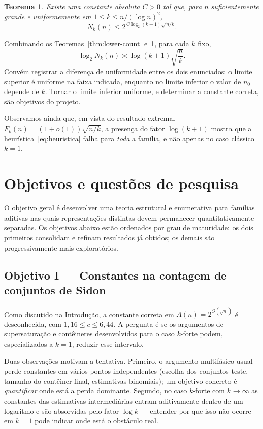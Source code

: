 \documentclass[11pt,a4paper]{article}
\newtheorem{theorem}{Teorema}[section]
\theoremstyle{definition}
\theoremstyle{remark}
\begin{document}
\begin{theorem}
  \label{thm:upper-count}
  Existe uma constante absoluta \(C>0\) tal que, para \(n\)
  suficientemente grande e \emph{uniformemente} em
  \(1\leq k\leq n/(\log n)^2\),
  \[
    N_k(n)\leq2^{\,C\log_2(k+1)\sqrt{n/k}} .
  \]
\end{theorem}

Combinando os Teoremas~\ref{thm:lower-count} e~\ref{thm:upper-count},
para cada \(k\) fixo,
\[
  \log_2 N_k(n)\asymp\log(k+1)\sqrt{\frac nk} .
\]
Convém registrar a diferença de uniformidade entre os dois enunciados: o
limite superior é uniforme na faixa indicada, enquanto no limite
inferior o valor de \(n_0\) depende de \(k\). Tornar o limite inferior
uniforme, e determinar a constante correta, são objetivos do projeto.

Observamos ainda que, em vista do resultado extremal
\(F_k(n)=(1+o(1))\sqrt{n/k}\), a presença do fator \(\log(k+1)\) mostra
que a heurística~\eqref{eq:heuristica} falha para \emph{toda} a família,
e não apenas no caso clássico \(k=1\).

\section{Objetivos e questões de pesquisa}

O objetivo geral é desenvolver uma teoria estrutural e enumerativa para
famílias aditivas nas quais representações distintas devem permanecer
quantitativamente separadas. Os objetivos abaixo estão ordenados por
grau de maturidade: os dois primeiros consolidam e refinam resultados já
obtidos; os demais são progressivamente mais exploratórios.

\subsection{Objetivo I --- Constantes na contagem de conjuntos de Sidon}

Como discutido na Introdução, a constante correta em
\(A(n)=2^{\Theta(\sqrt n)}\) é desconhecida, com
\(1{,}16\leq c\leq6{,}44\). A pergunta é se os argumentos de
supersaturação e contêineres desenvolvidos para o caso \(k\)-forte
podem, especializados a \(k=1\), reduzir esse intervalo.

Duas observações motivam a tentativa. Primeiro, o argumento
multifásico usual perde constantes em vários pontos independentes
(escolha dos conjuntos-teste, tamanho do contêiner final, estimativas
binomiais); um objetivo concreto é \emph{quantificar} onde está a perda
dominante. Segundo, no caso \(k\)-forte com \(k\to\infty\) as constantes
das estimativas intermediárias entram aditivamente dentro de um
logaritmo e são absorvidas pelo fator \(\log k\) --- entender por que
isso não ocorre em \(k=1\) pode indicar onde está o obstáculo real.
\end{document}
